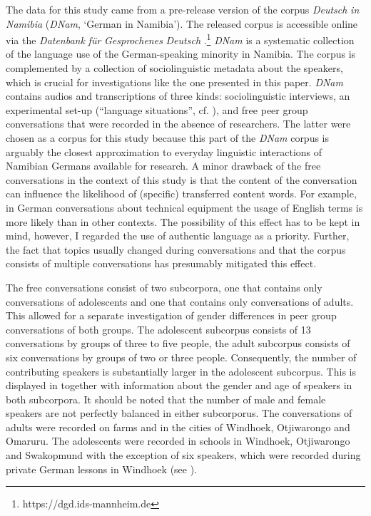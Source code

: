 \documentclass[output=paper]{langsci/langscibook}
\begin{document}
The data for this study came from a pre-release version of the corpus \textit{Deutsch} \textit{in} \textit{Namibia} (\textit{DNam}, ‘German in Namibia’). The released corpus is accessible online via the \textit{Datenbank} \textit{für} \textit{Gesprochenes} \textit{Deutsch} \citep{zimmer_korpus_2020}.\footnote{https://dgd.ids-mannheim.de} \textit{DNam} is a systematic collection of the language use of the German-speaking minority in Namibia. The corpus is complemented by a collection of sociolinguistic metadata about the speakers, which is crucial for investigations like the one presented in this paper. \textit{DNam} contains audios and transcriptions of three kinds: sociolinguistic interviews, an experimental set-up (“language situations”, cf. \citealt{wiese_language_2020, wiese_registerdifferenzierung_2021}), and free peer group conversations that were recorded in the absence of researchers. The latter were chosen as a corpus for this study because this part of the \textit{DNam} corpus is arguably the closest approximation to everyday linguistic interactions of Namibian Germans available for research. A minor drawback of the free conversations in the context of this study is that the content of the conversation can influence the likelihood of (specific) transferred content words. For example, in German conversations about technical equipment the usage of English terms is more likely than in other contexts. The possibility of this effect has to be kept in mind, however, I regarded the use of authentic language as a priority. Further, the fact that topics usually changed during conversations and that the corpus consists of multiple conversations has presumably mitigated this effect.

The free conversations consist of two subcorpora, one that contains only conversations of adolescents and one that contains only conversations of adults. This allowed for a separate investigation of gender differences in peer group conversations of both groups. The adolescent subcorpus consists of 13 conversations by groups of three to five people, the adult subcorpus consists of six conversations by groups of two or three people. Consequently, the number of contributing speakers is substantially larger in the adolescent subcorpus. This is displayed in  together with information about the gender and age of speakers in both subcorpora. It should be noted that the number of male and female speakers are not perfectly balanced in either subcorporus. The conversations of adults were recorded on farms and in the cities of Windhoek, Otjiwarongo and Omaruru. The adolescents were recorded in schools in Windhoek, Otjiwarongo and Swakopmund with the exception of six speakers, which were recorded during private German lessons in Windhoek (see ).
\end{document}
